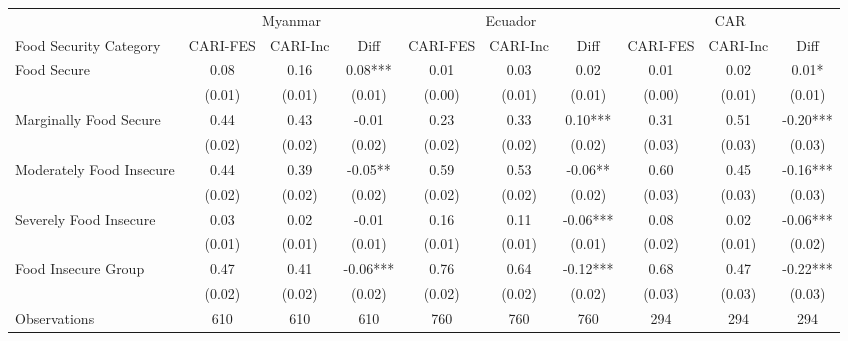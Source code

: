 \begin{tabular}{l*{9}c}
	\hline\hline
				\textbf{}                & \multicolumn{3}{c}{Myanmar}    & \multicolumn{3}{c}{Ecuador}    & \multicolumn{3}{c}{CAR}        \\
				Food   Security Category & CARI-FES & CARI-Inc & Diff     & CARI-FES & CARI-Inc & Diff     & CARI-FES & CARI-Inc & Diff     \\  \hline
				Food Secure              & 0.08     & 0.16     & 0.08***  & 0.01     & 0.03     & 0.02     & 0.01     & 0.02     & 0.01*    \\
				& (0.01)   & (0.01)   & (0.01)   & (0.00)   & (0.01)   & (0.01)   & (0.00)   & (0.01)   & (0.01)   \\
				Marginally Food Secure   & 0.44     & 0.43     & -0.01    & 0.23     & 0.33     & 0.10***  & 0.31     & 0.51     & -0.20*** \\
				& (0.02)   & (0.02)   & (0.02)   & (0.02)   & (0.02)   & (0.02)   & (0.03)   & (0.03)   & (0.03)   \\
				Moderately Food Insecure & 0.44     & 0.39     & -0.05**  & 0.59     & 0.53     & -0.06**  & 0.60     & 0.45     & -0.16*** \\
				& (0.02)   & (0.02)   & (0.02)   & (0.02)   & (0.02)   & (0.02)   & (0.03)   & (0.03)   & (0.03)   \\
				Severely Food Insecure   & 0.03     & 0.02     & -0.01    & 0.16     & 0.11     & -0.06*** & 0.08     & 0.02     & -0.06*** \\
				& (0.01)   & (0.01)   & (0.01)   & (0.01)   & (0.01)   & (0.01)   & (0.02)   & (0.01)   & (0.02)   \\
				Food Insecure Group      & 0.47     & 0.41     & -0.06*** & 0.76     & 0.64     & -0.12***  & 0.68     & 0.47     & -0.22*** \\
				& (0.02)   & (0.02)   & (0.02)   & (0.02)   & (0.02)   & (0.02)   & (0.03)   & (0.03)   & (0.03)   \\  \hline
			Observations             & 610      & 610      & 610      & 760      & 760      & 760      & 294      & 294      & 294      \\
	 \hline\hline
\end{tabular}
